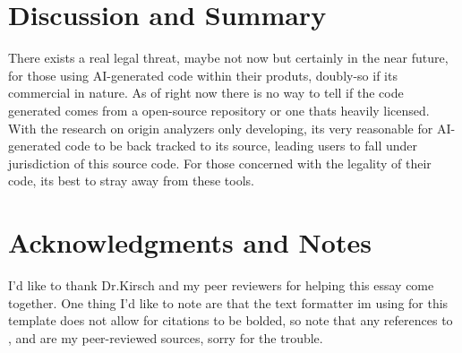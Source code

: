 \documentclass[journal]{IEEEtran}
\begin{document}

\section{Discussion and Summary}

There exists a real legal threat, maybe not now but certainly in the near future,
for those using AI-generated code within their produts, doubly-so if its commercial
in nature. As of right now there is no way to tell if the code generated comes
from a open-source repository or one thats heavily licensed. With the research
on origin analyzers only developing, its very reasonable for AI-generated code
to be back tracked to its source, leading users to fall under jurisdiction of
this source code. For those concerned with the legality of their code, its
best to stray away from these tools. 


\section*{Acknowledgments and Notes}
I'd like to thank Dr.Kirsch and my peer reviewers for helping this essay come together. 
One thing I'd like to note are that the text formatter im using for this template does
not allow for citations to be bolded, so note that any references to \cite{stokes2021},
\cite{harvard} and \cite{ma2024} are my peer-reviewed sources, sorry for the trouble.



\printbibliography
\end{document}
